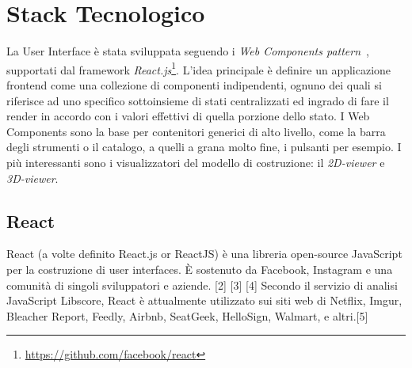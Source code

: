 \section{Stack Tecnologico}
\label{sec:chapter_2_section_3}

La User Interface è stata sviluppata seguendo i \emph{Web Components pattern}~\cite{web_components},
supportati dal framework \emph{React.js}\footnote{\url{https://github.com/facebook/react}}.
L'idea principale è definire un applicazione frontend come una collezione di componenti indipendenti,
ognuno dei quali si riferisce ad uno specifico sottoinsieme di stati centralizzati ed ingrado
di fare il render in accordo con i valori effettivi di quella porzione dello stato.
I Web Components sono la base per contenitori generici di alto livello, come la barra degli strumenti o il catalogo,
a quelli a grana molto fine, i pulsanti per esempio. I più interessanti sono i visualizzatori del
modello di costruzione: il \emph{2D-viewer} e \emph{3D-viewer}.

%
\subsection{React}
\label{sec:chapter_2_section_3_sub_1}
React (a volte definito React.js or ReactJS) è una libreria open-source JavaScript per la costruzione di user interfaces.
\`E sostenuto da Facebook, Instagram e una comunità di singoli sviluppatori e aziende.
[2] [3] [4] Secondo il servizio di analisi JavaScript Libscore, React è attualmente utilizzato sui
 siti web di Netflix, Imgur, Bleacher Report, Feedly, Airbnb, SeatGeek, HelloSign, Walmart, e altri.[5]


